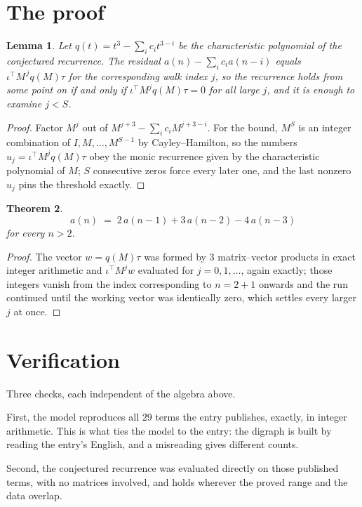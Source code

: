 \documentclass[11pt,a4paper]{article}
\theoremstyle{plain}
\newtheorem{theorem}{Theorem}
\newtheorem{lemma}[theorem]{Lemma}
\theoremstyle{definition}
\begin{document}
\section{The proof}

\begin{lemma}\label{lem:crit}
Let $q(t)=t^{3}-\sum_i c_it^{3-i}$ be the characteristic polynomial of the
conjectured recurrence. The residual $a(n)-\sum_ic_ia(n-i)$ equals
$\iota^{\!\top}M^{\,j}q(M)\tau$ for the corresponding walk index $j$, so the recurrence
holds from some point on if and only if $\iota^{\!\top}M^{j}q(M)\tau=0$ for all large $j$,
and it is enough to examine $j<S$.
\end{lemma}

\begin{proof}
Factor $M^{j}$ out of $M^{j+3}-\sum_ic_iM^{j+3-i}$. For the bound, $M^{S}$
is an integer combination of $I,M,\dots,M^{S-1}$ by Cayley--Hamilton, so the numbers
$u_j=\iota^{\!\top}M^{j}q(M)\tau$ obey the monic recurrence given by the characteristic
polynomial of $M$; $S$ consecutive zeros force every later one, and the last nonzero $u_j$
pins the threshold exactly.
\end{proof}

\begin{theorem}
\[
a(n)\;=\;2\,a(n-1) + 3\,a(n-2) - 4\,a(n-3)
\]
for every $n>2$.
\end{theorem}

\begin{proof}
The vector $w=q(M)\tau$ was formed by $3$ matrix--vector products in exact integer
arithmetic and $\iota^{\!\top}M^{j}w$ evaluated for $j=0,1,\dots$, again exactly; those
integers vanish from the index corresponding to $n=2+1$ onwards and the run continued
until the working vector was identically zero, which settles every larger $j$ at once.
\end{proof}

\section{Verification}

Three checks, each independent of the algebra above.

First, the model reproduces all $29$ terms the entry publishes, exactly, in integer
arithmetic. This is what ties the model to the entry: the digraph is built by reading the
entry's English, and a misreading gives different counts.

Second, the conjectured recurrence was evaluated directly on those published terms, with no
matrices involved, and holds wherever the proved range and the data overlap.
\end{document}
